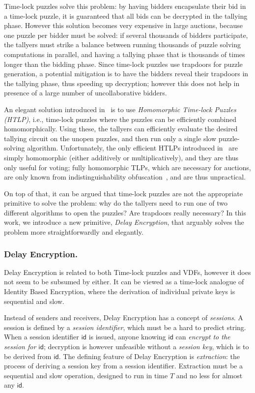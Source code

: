 \documentclass{llncs}
\newcommand{\id}{\mathsf{id}}
\begin{document}
Time-lock puzzles solve this problem: by having bidders encapsulate
their bid in a time-lock puzzle, it is guaranteed that all bids can be
decrypted in the tallying phase. %
However this solution becomes very expensive in large auctions,
because one puzzle per bidder must be solved: if several thousands of
bidders participate, the tallyers must strike a balance between
running thousands of puzzle solving computations in parallel, and
having a tallying phase that is thousands of times longer than the
bidding phase. %
Since time-lock puzzles use trapdoors for puzzle generation, a
potential mitigation is to have the bidders reveal their trapdoors in
the tallying phase, thus speeding up decryption; however this does not
help in presence of a large number of uncollaborative bidders.

An elegant solution introduced in~\cite{C:MalThy19} is to use
\emph{Homomorphic Time-lock Puzzles (HTLP)}, i.e., time-lock puzzles
where the puzzles can be efficiently combined homomorphically. %
Using these, the tallyers can efficiently evaluate the desired
tallying circuit on the unopen puzzles, and then run only a single
slow puzzle-solving algorithm. %
Unfortunately, the only efficient HTLPs introduced
in~\cite{C:MalThy19} are simply homomorphic (either additively or
multiplicatively), and they are thus only useful for voting; fully
homomorphic TLPs, which are necessary for auctions, are only known
from indistinguishability obfuscation~\cite{FOCS:GGHRSW13}, and are
thus unpractical. %

On top of that, it can be argued that time-lock puzzles are not the
appropriate primitive to solve the problem: why do the tallyers need
to run one of two different algorithms to open the puzzles? Are
trapdoors really necessary? %
In this work, we introduce a new primitive, \emph{Delay Encryption},
that arguably solves the problem more straightforwardly and elegantly.


\subsubsection{Delay Encryption.}
Delay Encryption is related to both Time-lock puzzles and VDFs,
however it does not seem to be subsumed by either. %
It can be viewed as a time-lock analogue of Identity Based Encryption,
where the derivation of individual private keys is sequential and
slow. %

Instead of senders and receivers, Delay Encryption has a concept of
\emph{sessions}. %
A session is defined by a \emph{session identifier}, which must be a
hard to predict string. %
When a session identifier $\id$ is issued, anyone knowing $\id$ can
\emph{encrypt to the session for $\id$}; decryption is however
unfeasible without a \emph{session key}, which is to be derived from
$\id$. %
The defining feature of Delay Encryption is \emph{extraction}: the
process of deriving a session key from a session identifier. %
Extraction must be a sequential and slow operation, designed to run in
time $T$ and no less for almost any $\id$.
\end{document}
